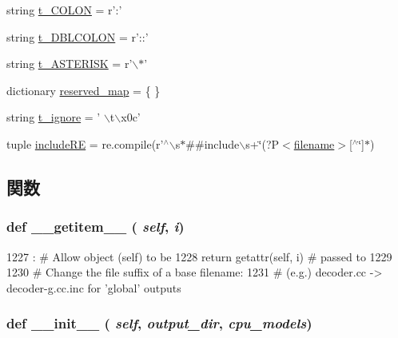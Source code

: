 \begin{DoxyCompactItemize}
string \hyperlink{classisa__parser_1_1ISAParser_a9b9d2edf94aee41b0ab348d063a0e98c}{t\_\-COLON} = r':'
\item 
string \hyperlink{classisa__parser_1_1ISAParser_a9d2954290594afb1fbe0896fafcddb17}{t\_\-DBLCOLON} = r'::'
\item 
string \hyperlink{classisa__parser_1_1ISAParser_aef64e90f5783bddafcf2bac767534a2c}{t\_\-ASTERISK} = r'$\backslash$$\ast$'
\item 
dictionary \hyperlink{classisa__parser_1_1ISAParser_a2fce270f6ee4bafd620b1b2f00cd9b79}{reserved\_\-map} = \{ \}
\item 
string \hyperlink{classisa__parser_1_1ISAParser_aeeb3d1122ca6e210d2b8f9b45d5bdc54}{t\_\-ignore} = ' $\backslash$t$\backslash$x0c'
\item 
tuple \hyperlink{classisa__parser_1_1ISAParser_af65aee482317f481dd087394ffbb486e}{includeRE} = re.compile(r'$^\wedge$$\backslash$s$\ast$\#\#include$\backslash$s+\char`\"{}(?P$<$\hyperlink{classisa__parser_1_1ISAParser_a2ff994e16bf9521154de4cf659a3b689}{filename}$>$\mbox{[}$^\wedge$\char`\"{}\mbox{]}$\ast$)
\end{DoxyCompactItemize}


\subsection{関数}
\hypertarget{classisa__parser_1_1ISAParser_a50d766f4276c3d8fe330ac8cd344a75f}{
\subsubsection[{\_\-\_\-getitem\_\-\_\-}]{\setlength{\rightskip}{0pt plus 5cm}def \_\-\_\-getitem\_\-\_\- ( {\em self}, \/   {\em i})}}
\label{classisa__parser_1_1ISAParser_a50d766f4276c3d8fe330ac8cd344a75f}



\begin{DoxyCode}
1227                             :    # Allow object (self) to be
1228         return getattr(self, i)  # passed to %
1229 
1230     # Change the file suffix of a base filename:
1231     #   (e.g.) decoder.cc -> decoder-g.cc.inc for 'global' outputs
\end{DoxyCode}
\hypertarget{classisa__parser_1_1ISAParser_ac775ee34451fdfa742b318538164070e}{
\subsubsection[{\_\-\_\-init\_\-\_\-}]{\setlength{\rightskip}{0pt plus 5cm}def \_\-\_\-init\_\-\_\- ( {\em self}, \/   {\em output\_\-dir}, \/   {\em cpu\_\-models})}}
\label{classisa__parser_1_1ISAParser_ac775ee34451fdfa742b318538164070e}



